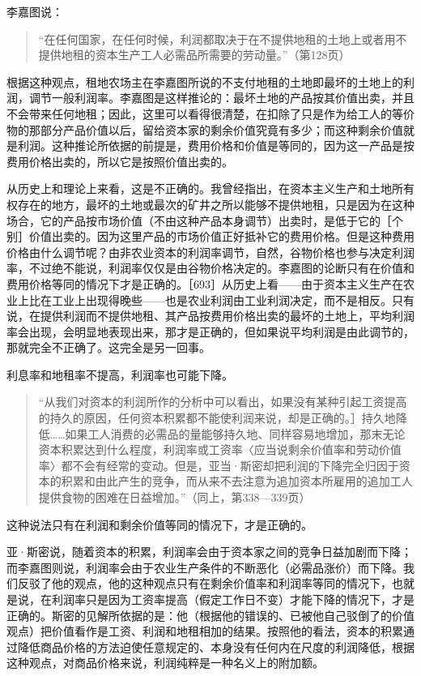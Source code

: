 李嘉图说：

\begin{quote}{“在任何国家，在任何时候，利润都取决于在不提供地租的土地上或者用不提供地租的资本生产工人必需品所需要的劳动量。”（第128页）}\end{quote}

根据这种观点，租地农场主在李嘉图所说的不支付地租的土地即最坏的土地上的利润，调节一般利润率。李嘉图是这样推论的：最坏土地的产品按其价值出卖，并且不会带来任何地租；因此，这里可以看得很清楚，在扣除了只是作为给工人的等价物的那部分产品价值以后，留给资本家的剩余价值究竟有多少；而这种剩余价值就是利润。这种推论所依据的前提是，费用价格和价值是等同的，因为这一产品是按费用价格出卖的，所以它是按照价值出卖的。

从历史上和理论上来看，这是不正确的。我曾经指出，在资本主义生产和土地所有权存在的地方，最坏的土地或最次的矿井之所以能够不提供地租，只是因为在这种场合，它的产品按市场价值（不由这种产品本身调节）出卖时，是低于它的［个别］价值出卖的。因为这里产品的市场价值正好抵补它的费用价格。但是这种费用价格由什么调节呢？由非农业资本的利润率调节，自然，谷物价格也参与决定利润率，不过绝不能说，利润率仅仅是由谷物价格决定的。李嘉图的论断只有在价值和费用价格等同的情况下才是正确的。［693］从历史上看——由于资本主义生产在农业上比在工业上出现得晚些——也是农业利润由工业利润决定，而不是相反。只有说，在提供利润而不提供地租、其产品按费用价格出卖的最坏的土地上，平均利润率会出现，会明显地表现出来，那才是正确的，但如果说平均利润是由此调节的，那就完全不正确了。这完全是另一回事。

利息率和地租率不提高，利润率也可能下降。

\begin{quote}{“从我们对资本的利润所作的分析中可以看出，如果没有某种引起工资提高的持久的原因，任何资本积累都不能使利润来说，却是正确的。］持久地降低……如果工人消费的必需品的量能够持久地、同样容易地增加，那末无论资本积累达到什么程度，利润率或工资率〈应当说剩余价值率和劳动价值率〉都不会有经常的变动。但是，亚当·斯密却把利润的下降完全归因于资本的积累和由此产生的竞争，而从来不去注意为追加资本所雇用的追加工人提供食物的困难在日益增加。”（同上，第338—339页）}\end{quote}

这种说法只有在利润和剩余价值等同的情况下，才是正确的。

亚·斯密说，随着资本的积累，利润率会由于资本家之间的竞争日益加剧而下降；而李嘉图则说，利润率会由于农业生产条件的不断恶化（必需品涨价）而下降。我们反驳了他的观点，他的这种观点只有在剩余价值率和利润率等同的情况下，也就是说，在利润率只是因为工资率提高（假定工作日不变）才能下降的情况下，才是正确的。斯密的见解所依据的是：他（根据他的错误的、已被他自己驳倒了的价值观点）把价值看作是工资、利润和地租相加的结果。按照他的看法，资本的积累通过降低商品价格的方法迫使任意规定的、本身没有任何内在尺度的利润降低，根据这种观点，对商品价格来说，利润纯粹是一种名义上的附加额。

